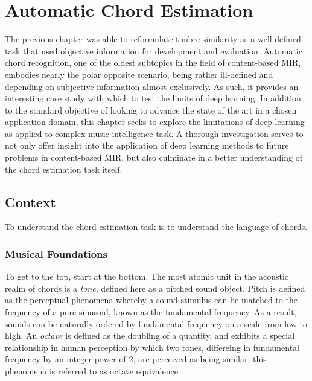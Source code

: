 \graphicspath{{5/figures/}}

\chapter{Automatic Chord Estimation}
\label{chp:chord_estimation}

The previous chapter was able to reformulate timbre similarity as a well-defined task that used objective information for development and evaluation.
Automatic chord recognition, one of the oldest subtopics in the field of content-based MIR, embodies nearly the polar opposite scenario, being rather ill-defined and depending on subjective information almost exclusively.
As such, it provides an interesting case study with which to test the limits of deep learning.
In addition to the standard objective of looking to advance the state of the art in a chosen application domain, this chapter seeks to explore the limitations of deep learning as applied to complex music intelligence task.
A thorough investigation serves to not only offer insight into the application of deep learning methods to future problems in content-based MIR, but also culminate in a better understanding of the chord estimation task itself.


\section{Context}
\label{sec:context}

To understand the chord estimation task is to understand the language of chords.



\subsection{Musical Foundations}
\label{subsec:musical_foundations}

To get to the top, start at the bottom.
The most atomic unit in the acoustic realm of chords is a \emph{tone}, defined here as a pitched sound object.
Pitch is defined as the perceptual phenomena whereby a sound stimulus can be matched to the frequency of a pure sinusoid, known as the fundamental frequency.
As a result, sounds can be naturally ordered by fundamental frequency on a scale from low to high.
An \emph{octave} is defined as the doubling of a quantity, and exhibits a special relationship in human perception by which two tones, differeing in fundamental frequency by an integer power of 2, are perceived as being similar; this phenomena is referred to as octave equivalence \cite{?}.

